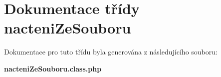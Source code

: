 \section{Dokumentace třídy nacteniZeSouboru}
\label{classnacteniZeSouboru}


Dokumentace pro tuto třídu byla generována z následujícího souboru:\begin{CompactItemize}
\item 
{\bf nacteniZeSouboru.class.php}\end{CompactItemize}
